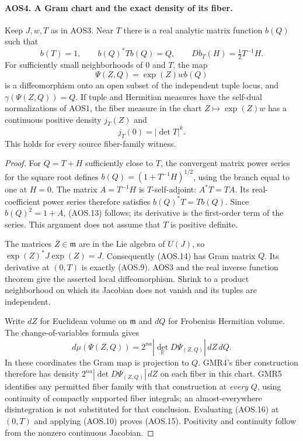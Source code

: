 \paragraph{AOS4. A Gram chart and the exact density of its fiber.}
\label{claim:AOS4}
Keep $J,w,T$ as in AOS3.  Near $T$ there is a real analytic matrix
function $b(Q)$ such that
\[
 b(T)=1,\qquad b(Q)^*Tb(Q)=Q,
       \qquad Db_T(H)=\tfrac12T^{-1}H.
 \tag{AOS.13}
\]
For sufficiently small neighborhoods of $0$ and $T$, the map
\[
       \Psi(Z,Q)=\exp(Z)wb(Q)
 \tag{AOS.14}
\]
is a diffeomorphism onto an open subset of the independent tuple
locus, and $\gamma(\Psi(Z,Q))=Q$.  If tuple and Hermitian measures
have the self-dual normalizations of AOS1, the fiber measure in the
chart $Z\mapsto\exp(Z)w$ has a continuous positive density $j_T(Z)$
and
\[
                     j_T(0)=|\det T|^k.
 \tag{AOS.15}
\]
This holds for every source fiber-family witness.

\begin{proof}
For $Q=T+H$ sufficiently close to $T$, the convergent matrix power
series for the square root defines
$b(Q)=(1+T^{-1}H)^{1/2}$, using the branch equal to one at $H=0$.
The matrix $A=T^{-1}H$ is $T$-self-adjoint: $A^*T=TA$.
Its real-coefficient power series therefore satisfies
$b(Q)^*T=Tb(Q)$.  Since $b(Q)^2=1+A$, (AOS.13) follows;
its derivative is the first-order term of the series.  This argument
does not assume that $T$ is positive definite.

The matrices $Z\in\mathfrak m$ are in the Lie algebra of $U(J)$,
so $\exp(Z)^*J\exp(Z)=J$.  Consequently (AOS.14) has Gram matrix
$Q$.  Its derivative at $(0,T)$ is exactly (AOS.9).  AOS3 and the
real inverse function theorem give the asserted local diffeomorphism.
Shrink to a product neighborhood on which its Jacobian does not
vanish and its tuples are independent.

Write $dZ$ for Euclidean volume on $\mathfrak m$ and $dQ$ for
Frobenius Hermitian volume.  The change-of-variables formula gives
\[
       d\mu(\Psi(Z,Q))
         =2^{na}|\det_{\mathbb R}D\Psi_{(Z,Q)}|\,dZ\,dQ.
 \tag{AOS.16}
\]
In these coordinates the Gram map is projection to $Q$.  GMR4's
fiber construction therefore has density
$2^{na}|\det D\Psi_{(Z,Q)}|\,dZ$ on each fiber in this chart.
GMR5 identifies any permitted fiber family with that construction
at \emph{every} $Q$, using continuity of compactly supported fiber
integrals; an almost-everywhere disintegration is not substituted
for that conclusion.  Evaluating (AOS.16) at $(0,T)$ and applying
(AOS.10) proves (AOS.15).  Positivity and continuity follow from
the nonzero continuous Jacobian.
\end{proof}

